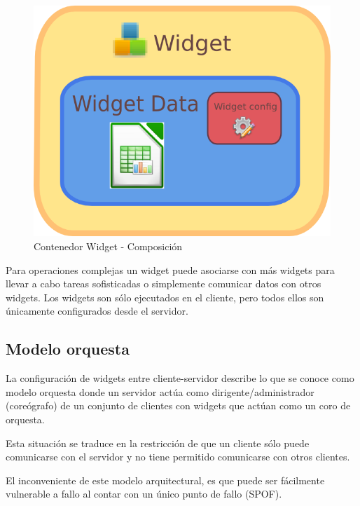 \begin{figure}[ht]
    \begin{center}
        \includegraphics[scale=0.7]{src/img/widget-container.png}
        \caption[Contenedor Widget - Composición] {Contenedor Widget -
        Composición}
    \end{center}
\end{figure}

Para operaciones complejas un widget puede asociarse con más widgets para
llevar a cabo tareas sofisticadas o simplemente comunicar datos con otros
widgets. Los widgets son sólo ejecutados en el cliente, pero todos ellos son
únicamente configurados desde el servidor.

\subsection{Modelo orquesta}

La configuración de widgets entre cliente-servidor describe lo que se
conoce como modelo orquesta\cite{RoS04} donde un servidor actúa como
dirigente/administrador (coreógrafo) de un conjunto de
clientes con widgets que actúan como un coro de orquesta.

Esta situación se traduce en la restricción de que un cliente sólo puede
comunicarse con el servidor y no tiene permitido comunicarse con otros
clientes.

\newpage

El inconveniente de este modelo arquitectural, es que puede ser fácilmente
vulnerable a fallo al contar con un único punto de fallo
(\acs{SPOF}\label{acro:SPOF}).

